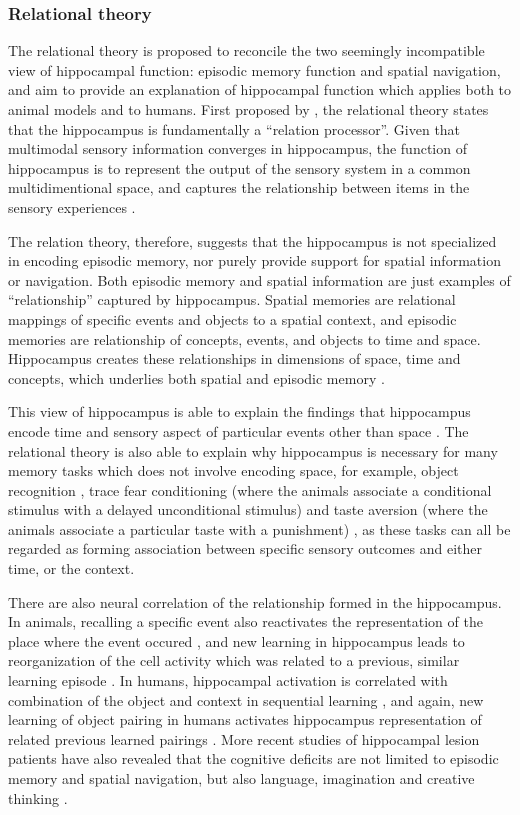 \subsubsection{Relational theory}

The relational theory is proposed to reconcile the two seemingly incompatible view of hippocampal function: episodic memory function and spatial navigation, and aim to provide an explanation of hippocampal function which applies both to animal models and to humans. First proposed by \citet{eichenbaum93}, the relational theory states that the hippocampus is fundamentally a ``relation processor''. Given that multimodal sensory information converges in hippocampus, the function of hippocampus is to represent the output of the sensory system in a common multidimentional space, and captures the relationship between items in the sensory experiences \citep{eichenbaum93}.

The relation theory, therefore, suggests that the hippocampus is not specialized in encoding episodic memory, nor purely provide support for spatial information or navigation. Both episodic memory and spatial information are just examples of ``relationship'' captured by hippocampus. Spatial memories are relational mappings of specific events and objects to a spatial context, and episodic memories are relationship of concepts, events, and objects to time and space. Hippocampus creates these relationships in dimensions of space, time and concepts, which underlies both spatial and episodic memory \citep{
eichenbaum14}.

This view of hippocampus is able to explain the findings that hippocampus encode time and sensory aspect of particular events other than space \citep{hampson93, young94, wood99, moser08}. The relational theory is also able to explain why hippocampus is necessary for many memory tasks which does not involve encoding space, for example, object recognition \citep{eacott04, langston10}, trace fear conditioning (where the animals associate a conditional stimulus with a delayed unconditional stimulus) \citep{crestani02, mcechron98} and taste aversion (where the animals associate a particular taste with a punishment) \citep{best73, gallo95}, as these tasks can all be regarded as forming association between specific sensory outcomes and either time, or the context. 

There are also neural correlation of the relationship formed in the hippocampus. In animals, recalling a specific event also reactivates the representation of the place where the event occured \citep{moita03, itskov11}, and new learning in hippocampus leads to reorganization of the cell activity which was related to a previous, similar learning episode \citep{mckenzie13}. In humans, hippocampal activation is correlated with combination of the object and context in sequential learning \citep{hsieh14}, and again, new learning of object pairing in humans activates hippocampus representation of related previous learned pairings \citep{zeithamova12}. More recent studies of hippocampal lesion patients have also revealed that the cognitive deficits are not limited to episodic memory and spatial navigation, but also language, imagination and creative thinking \citep{duff09, duff13}.


